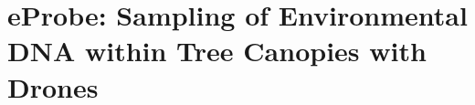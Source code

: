 \chapter[eProbe: Sampling eDNA from Tree Canopies with Drones]{eProbe: Sampling of Environmental DNA within Tree Canopies with Drones}
\label{ch:EP}


%
%

